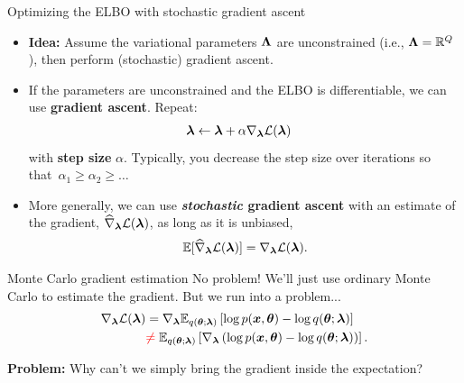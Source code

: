 \documentclass[aspectratio=169]{beamer}
\begin{document}
\begin{frame}[t]{Optimizing the ELBO with stochastic gradient ascent}
    \begin{itemize}
    \item<1-> \textbf{Idea: } Assume the variational parameters $\boldsymbol{\Lambda}$ are unconstrained (i.e., $\boldsymbol{\Lambda} = \mathbb{R}^Q$), then perform (stochastic) gradient ascent. 
    
    \item<2-> If the parameters are unconstrained and the ELBO is differentiable, we can use \textbf{gradient ascent}. 
    Repeat:
    \begin{align*}
        \boldsymbol{\lambda} &\leftarrow \boldsymbol{\lambda} + \alpha \nabla_{\boldsymbol{\lambda}} \mathcal{L}(\boldsymbol{\lambda}) 
    \end{align*}
    with \textbf{step size} $\alpha$. Typically, you decrease the step size over iterations so that~$\alpha_1 \geq \alpha_2 \geq \ldots$
    
    \item<3-> More generally, we can use \textbf{\textit{stochastic} gradient ascent} with an estimate of the gradient, $\widehat{\nabla}_{\boldsymbol{\lambda}} \mathcal{L}(\boldsymbol{\lambda})$, as long as it is unbiased,
    \begin{align*}
        \mathbb{E}[\widehat{\nabla}_{\boldsymbol{\lambda}} \mathcal{L}(\boldsymbol{\lambda})] = \nabla_{\boldsymbol{\lambda}} \mathcal{L}(\boldsymbol{\lambda}).
    \end{align*}
    \end{itemize}
\end{frame}

\begin{frame}[t]{Monte Carlo gradient estimation}
No problem! We'll just use ordinary Monte Carlo to estimate the gradient. But we run into a problem...
\begin{align*}
\nabla_{\boldsymbol{\lambda}} \mathcal{L}(\boldsymbol{\lambda}) 
&= \nabla_{\boldsymbol{\lambda}} \mathbb{E}_{q(\boldsymbol{\theta}; \boldsymbol{\lambda})} \left[ \log p(\boldsymbol{x}, \boldsymbol{\theta}) - \log q(\boldsymbol{\theta}; \boldsymbol{\lambda}) \right] \\
&\textcolor{red}{\neq} \;  \mathbb{E}_{q(\boldsymbol{\theta}; \boldsymbol{\lambda})} \left[ \nabla_{\boldsymbol{\lambda}} \left(\log p(\boldsymbol{x}, \boldsymbol{\theta}) - \log q(\boldsymbol{\theta}; \boldsymbol{\lambda})\right) \right].
\end{align*}

\textbf{Problem: } Why can't we simply bring the gradient inside the expectation?
\end{frame}
\end{document}
